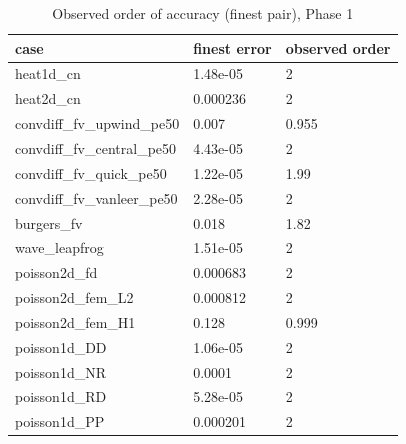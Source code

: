 \begin{table}[t]\centering\small\caption{Observed order of accuracy (finest pair), Phase 1}\label{tab:phase1}
\begin{tabular}{lll}\toprule
case & finest error & observed order \\ \midrule
heat1d\_cn & 1.48e-05 & 2 \\
heat2d\_cn & 0.000236 & 2 \\
convdiff\_fv\_upwind\_pe50 & 0.007 & 0.955 \\
convdiff\_fv\_central\_pe50 & 4.43e-05 & 2 \\
convdiff\_fv\_quick\_pe50 & 1.22e-05 & 1.99 \\
convdiff\_fv\_vanleer\_pe50 & 2.28e-05 & 2 \\
burgers\_fv & 0.018 & 1.82 \\
wave\_leapfrog & 1.51e-05 & 2 \\
poisson2d\_fd & 0.000683 & 2 \\
poisson2d\_fem\_L2 & 0.000812 & 2 \\
poisson2d\_fem\_H1 & 0.128 & 0.999 \\
poisson1d\_DD & 1.06e-05 & 2 \\
poisson1d\_NR & 0.0001 & 2 \\
poisson1d\_RD & 5.28e-05 & 2 \\
poisson1d\_PP & 0.000201 & 2 \\
\bottomrule\end{tabular}\end{table}
